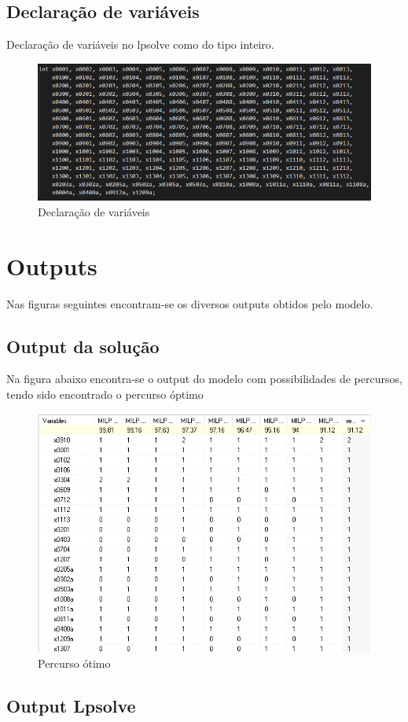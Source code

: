 \subsection{Declaração de variáveis}

Declaração de variáveis no lpsolve como do tipo inteiro.

\begin{figure}[h!]
\centering
\includegraphics[width=1\textwidth]{images/main/declaracao.png}
\caption{Declaração de variáveis}
\end{figure}
\newpage

\section{Outputs}
Nas figuras seguintes encontram-se os diversos outputs obtidos pelo modelo.
\subsection{Output da solução}

Na figura abaixo encontra-se o output do modelo com possibilidades de percursos, tendo sido encontrado o percurso óptimo

\begin{figure}[h!]
\centering
\includegraphics[width=.4\textwidth]{images/main/percursoOptimo.png}
\caption{Percurso ótimo}
\end{figure}

\subsection{Output Lpsolve}

